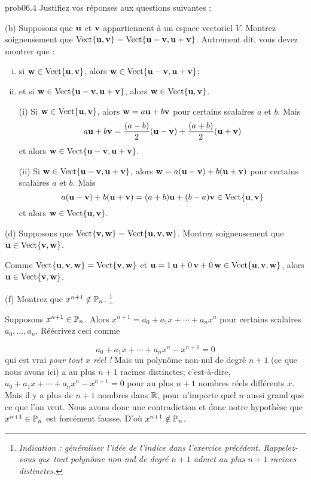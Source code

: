 \bigskip
\begin{sol}{prob06.4} Justifiez vos réponses aux questions suivantes :
\medskip

(b) Supposons que $\uu$ et $\vv$ appartiennent à un espace vectoriel $V$. Montrez soigneusement que $\sp{\uu,\vv}=\sp{\uu-\vv, \uu+\vv}$. Autrement dit, vous devez montrer que :
\begin{enumerate}[(i)]
\item si $\ww\in \sp{\uu,\vv}$, alors $\ww \in \sp{\uu-\vv, \uu+\vv}$;
\item et si $\ww\in \sp{\uu-\vv, \uu+\vv}$, alors $\ww\in \sp{\uu,\vv} $.


\soln (i) Si $\ww\in \sp{\uu,\vv}$, alors $\ww=a\uu+b\vv$ pour certains scalaires $a$ et $b$. Mais $$a\uu+b\vv=\dfrac{(a-b)}2 (\uu-\vv) +\dfrac{(a+b)}2 (\uu+\vv)$$ et alors $\ww \in \sp{\uu-\vv, \uu+\vv}$. 

(ii) Si $\ww\in \sp{\uu-\vv, \uu+\vv}$, alors $\ww=a(\uu-\vv)+b(\uu+\vv)$ pour certains scalaires $a$ et $b$. Mais $$a(\uu-\vv)+b(\uu+\vv)=(a+b)\uu + (b-a)\vv \in \sp{\uu,\vv}$$ et alors $\ww\in \sp{\uu,\vv}$.

\end{enumerate}
\medskip


(d)  Supposons que $\sp{\vv,\ww}=\sp{\uu,\vv,\ww}$. Montrez soigneusement que $\uu \in \sp{\vv,\ww}$. 

\soln Comme $\sp{\uu,\vv,\ww}=\sp{\vv,\ww}$ et $\uu=1\, \uu +0\,\vv +0\, \ww\in \sp{\uu,\vv,\ww}$, alors $\uu \in \sp{\vv,\ww}$.
\medskip

(f)  Montrez que $x^{n+1} \notin \PP_n$. \footnote{\it Indication : généraliser l'idée de l'indice dans l'exercice précédent. Rappelez-vous que tout polynôme non-nul de degré $n+1$ admet au plus $n+1$ racines distinctes.}

\soln Supposons $x^{n+1} \in \PP_n$. Alors $x^{n+1}=a_0 + a_1 x + \cdots + a_nx^n$ pour certains scalaires $a_0, \dots, a_n$. R\'e\'ecrivez ceci comme

$$ a_0 + a_1 x + \cdots + a_nx^n - x^{n+1}=0$$ qui est vrai {\it pour tout $x$ r\'eel !} Mais un polynôme non-nul de degré $n+1$ (ce que nous avons ici) a au plus $n+1$ racines distinctes; c'est-à-dire, $ a_0 + a_1 x + \cdots + a_nx^n - x^{n+1}=0$ pour au plus $n+1$ nombres réels différents $x$.  Mais il y a plus de $n+1$ nombres dans $\R$, pour n'importe quel $n$ aussi grand que ce que l'on veut. Nous avons donc une contradiction et donc notre hypothèse que $x^{n+1} \in \PP_n$ est forcément fausse. D'où $x^{n+1} \notin \PP_n$.
\medskip


\end{sol}
